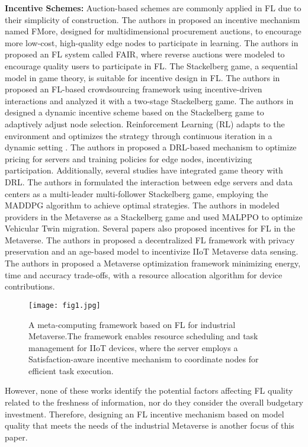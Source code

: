 \textbf{Incentive Schemes:} Auction-based schemes are commonly applied in FL due to their simplicity of construction. The authors in \cite{b30} proposed an incentive mechanism named FMore, designed for multidimensional procurement auctions, to encourage more low-cost, high-quality edge nodes to participate in learning. The authors in \cite{b24} proposed an FL system called FAIR, where reverse auctions were modeled to encourage quality users to participate in FL. The Stackelberg game, a sequential model in game theory, is suitable for incentive design in FL. The authors in \cite{b33} proposed an FL-based crowdsourcing framework using incentive-driven interactions and analyzed it with a two-stage Stackelberg game. The authors in \cite{b34} designed a dynamic incentive scheme based on the Stackelberg game to adaptively adjust node selection. Reinforcement Learning (RL) adapts to the environment and optimizes the strategy through continuous iteration in a dynamic setting \cite{b31}. The authors in \cite{b32} proposed a DRL-based mechanism to optimize pricing for servers and training policies for edge nodes, incentivizing participation. Additionally, several studies have integrated game theory with DRL. The authors in \cite{b46} formulated the interaction between edge servers and data centers as a multi-leader multi-follower Stackelberg game, employing the MADDPG \cite{b55} algorithm to achieve optimal strategies. The authors in \cite{b45} modeled providers in the Metaverse as a Stackelberg game and used MALPPO to optimize Vehicular Twin migration. Several papers also proposed incentives for FL in the Metaverse. The authors in \cite{b35} proposed a decentralized FL framework with privacy preservation and an age-based model to incentivize IIoT Metaverse data sensing. The authors in \cite{b36} proposed a Metaverse optimization framework minimizing energy, time and accuracy trade-offs, with a resource allocation algorithm for device contributions.

 \begin{figure*}[!t]
	\centerline{\texttt{[image: fig1.jpg]}}
	\caption{A meta-computing framework based on FL for industrial Metaverse.The framework enables resource scheduling and task management for IIoT devices, where the server employs a Satisfaction-aware incentive mechanism to coordinate nodes for efficient task execution.}
	\label{fig1}
\end{figure*}

However, none of these works identify the potential factors affecting FL quality related to the freshness of information, nor do they consider the overall budgetary investment. Therefore, designing an FL incentive mechanism based on model quality that meets the needs of the industrial Metaverse is another focus of this paper.
